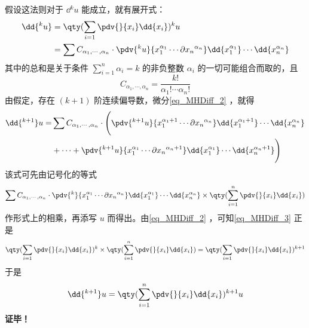  假设这法则对于 $\dd{^k u}$ 能成立，就有展开式：
 \begin{equation}\label{eq_MHDiff_2}
 \begin{aligned}
 \dd{^k u}&=\qty(\sum_{i=1}\pdv{}{x_i}\dd{x_i})^k u\\
 &=\sum C_{\alpha_1,\cdots,\alpha_n}\cdot\pdv{^k u}{x_1^{\alpha_1}\cdots\partial{x_n}^{\alpha_n}}\dd{x_1^{\alpha_1}}\cdots\dd{x_n^{\alpha_n}}
 \end{aligned}
 \end{equation}
 其中的总和是关于条件 $\sum_{i=1}^n\alpha_i=k$ 的非负整数 $\alpha_i$ 的一切可能组合而取的，且
 \begin{equation}
 C_{\alpha_1,\cdots,\alpha_n}=\frac{k!}{\alpha_1!\cdots\alpha_n!}
 \end{equation}
 由假定，存在 $(k+1)$ 阶连续偏导数，微分\autoref{eq_MHDiff_2} ，就得
 \begin{equation}
  \begin{aligned}
 \dd{^{k+1}}u=&\sum C_{\alpha_1,\cdots,\alpha_n}\cdot\Bigg(\pdv{^{k+1} u}{x_1^{\alpha_1+1}\cdots\partial{x_n}^{\alpha_n}}\dd{x_1^{\alpha_1+1}}\cdots\dd{x_n^{\alpha_n}}\\
 &+\cdots+\pdv{^{k+1} u}{x_1^{\alpha_1}\cdots\partial{x_n}^{\alpha_n+1}}\dd{x_1^{\alpha_1}}\cdots\dd{x_n^{\alpha_n+1}}\Bigg)
 \end{aligned}
 \end{equation}
 该式可先由记号化的等式
 \begin{equation}\label{eq_MHDiff_3}
 \sum C_{\alpha_1,\cdots,\alpha_n}\cdot\pdv{^{k} }{x_1^{\alpha_1}\cdots\partial{x_n}^{\alpha_n}}\dd{x_1^{\alpha_1}}\cdots\dd{x_n^{\alpha_n}}\times\qty(\sum_{i=1}^n\pdv{}{x_i}\dd{x_i})
 \end{equation}
 作形式上的相乘，再添写 $u$ 而得出。由\autoref{eq_MHDiff_2} ，可知\autoref{eq_MHDiff_3} 正是
 \begin{equation}
 \qty(\sum_{i=1}\pdv{}{x_i}\dd{x_i})^k\times\qty(\sum_{i=1}^n\pdv{}{x_i}\dd{x_i})=\qty(\sum_{i=1}\pdv{}{x_i}\dd{x_i})^{k+1}
 \end{equation}
 于是
 \begin{equation}
 \dd{^{k+1}}u=\qty(\sum_{i=1}^n \pdv{}{x_i}\dd{x_i})^{k+1}u
 \end{equation}
 \textbf{证毕！}
